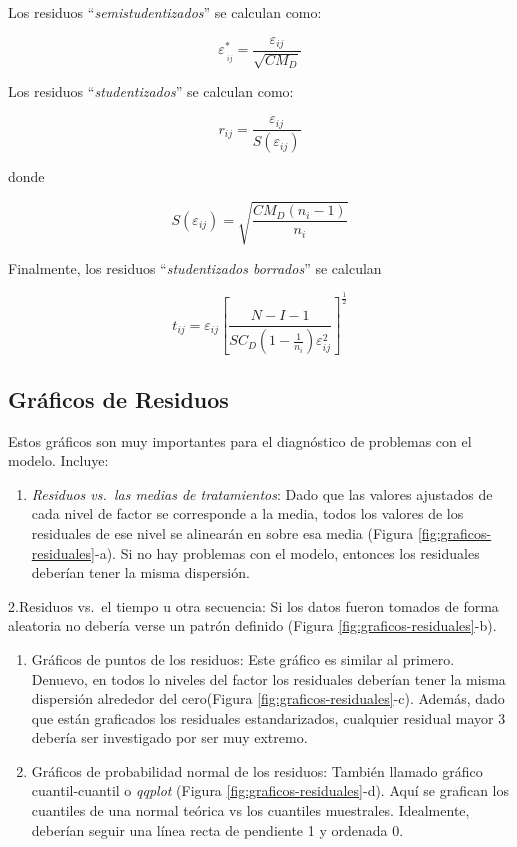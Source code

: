 \documentclass[]{book}
\providecommand{\tightlist}{%
  \setlength{\itemsep}{0pt}\setlength{\parskip}{0pt}}
\theoremstyle{definition}
\theoremstyle{definition}
\theoremstyle{definition}
\theoremstyle{remark}
\begin{document}
Los residuos ``\emph{semistudentizados}'' se calculan como:

\[
\varepsilon_{\ _{ij}}^{*} = \frac{\varepsilon_{ij}}{\sqrt{CM_D}}
\]

Los residuos ``\emph{studentizados}'' se calculan como:

\[
r_{ij} = \frac{\varepsilon_{ij}}{S\left( \varepsilon_{ij} \right)}
\]

donde

\[
S\left( \varepsilon_{ij} \right) = \sqrt{\frac{CM_D\left( n_{i} - 1 \right)}{n_{i}}}
\]

Finalmente, los residuos ``\emph{studentizados borrados}'' se calculan

\[
t_{ij} = \varepsilon_{ij}\left\lbrack \frac{N - I - 1}{SC_D\left( 1 - \frac{1}{n_{i}} \right)\varepsilon_{ij}^{2}} \right\rbrack^{\frac{1}{2}}
\]

\hypertarget{graficos-de-residuos}{%
\subsection{Gráficos de Residuos}\label{graficos-de-residuos}}

Estos gráficos son muy importantes para el diagnóstico de problemas con
el modelo. Incluye:

\begin{enumerate}
\def\labelenumi{\arabic{enumi}.}
\tightlist
\item
  \emph{Residuos vs.~las medias de tratamientos}: Dado que las valores
  ajustados de cada nivel de factor se corresponde a la media, todos los
  valores de los residuales de ese nivel se alinearán en sobre esa media
  (Figura \ref{fig:graficos-residuales}-a). Si no hay problemas con el
  modelo, entonces los residuales deberían tener la misma dispersión.
\end{enumerate}

2.Residuos vs.~el tiempo u otra secuencia: Si los datos fueron tomados
de forma aleatoria no debería verse un patrón definido (Figura
\ref{fig:graficos-residuales}-b).

\begin{enumerate}
\def\labelenumi{\arabic{enumi}.}
\setcounter{enumi}{2}
\item
  Gráficos de puntos de los residuos: Este gráfico es similar al
  primero. Denuevo, en todos lo niveles del factor los residuales
  deberían tener la misma dispersión alrededor del cero(Figura
  \ref{fig:graficos-residuales}-c). Además, dado que están graficados
  los residuales estandarizados, cualquier residual mayor 3 debería ser
  investigado por ser muy extremo.
\item
  Gráficos de probabilidad normal de los residuos: También llamado
  gráfico cuantil-cuantil o \emph{qqplot} (Figura
  \ref{fig:graficos-residuales}-d). Aquí se grafican los cuantiles de
  una normal teórica vs los cuantiles muestrales. Idealmente, deberían
  seguir una línea recta de pendiente 1 y ordenada 0.
\end{enumerate}
\end{document}
